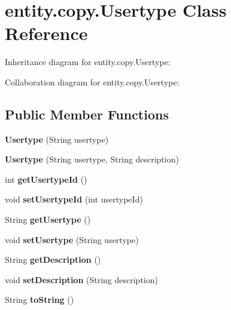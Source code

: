 \hypertarget{classentity_1_1copy_1_1_usertype}{}\section{entity.\+copy.\+Usertype Class Reference}
\label{classentity_1_1copy_1_1_usertype}


Inheritance diagram for entity.\+copy.\+Usertype\+:


Collaboration diagram for entity.\+copy.\+Usertype\+:
\subsection*{Public Member Functions}
\begin{DoxyCompactItemize}
\item 
\mbox{\label{classentity_1_1copy_1_1_usertype_ac3ce0ce958d0c3bea17d240edbac174e}} 
{\bfseries Usertype} (String usertype)
\item 
\mbox{\label{classentity_1_1copy_1_1_usertype_a61039f08470265f57f229ffe16086de9}} 
{\bfseries Usertype} (String usertype, String description)
\item 
\mbox{\label{classentity_1_1copy_1_1_usertype_ab9650d3e80eafd3630f1b9eeb7c30fb0}} 
int {\bfseries get\+Usertype\+Id} ()
\item 
\mbox{\label{classentity_1_1copy_1_1_usertype_a282dc800f5c063117f514a8d143da70f}} 
void {\bfseries set\+Usertype\+Id} (int usertype\+Id)
\item 
\mbox{\label{classentity_1_1copy_1_1_usertype_a52ee6376362ddf89577bf45afc6d24a4}} 
String {\bfseries get\+Usertype} ()
\item 
\mbox{\label{classentity_1_1copy_1_1_usertype_a2d6d1c8e6c10b354c99bc322e4de6a93}} 
void {\bfseries set\+Usertype} (String usertype)
\item 
\mbox{\label{classentity_1_1copy_1_1_usertype_a1b1461147a837afc5089c3c877fb10e9}} 
String {\bfseries get\+Description} ()
\item 
\mbox{\label{classentity_1_1copy_1_1_usertype_a63c9c8b5f7fe4a39cb4788e94e4d66ca}} 
void {\bfseries set\+Description} (String description)
\item 
\mbox{\label{classentity_1_1copy_1_1_usertype_a8036d5139f37b27e90cbed19ec8749bc}} 
String {\bfseries to\+String} ()
\end{DoxyCompactItemize}


